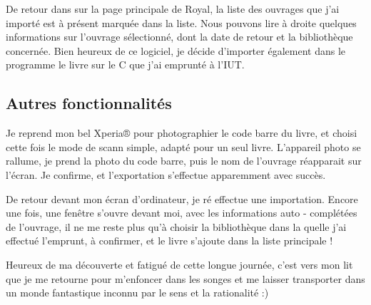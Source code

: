 De retour dans sur la page principale de Royal, la liste des ouvrages que j'ai importé est à présent marquée dans la liste. 
Nous pouvons lire à droite quelques informations sur l'ouvrage sélectionné, dont la date de retour et la bibliothèque concernée. 
Bien heureux de ce logiciel, je décide d'importer également dans le programme le livre sur le C que j'ai emprunté à l'IUT. 

\subsection {Autres fonctionnalités}

Je reprend mon bel Xperia® pour photographier le code barre du livre, et choisi cette fois le mode de scann simple, adapté pour un seul livre. 
L'appareil photo se rallume, je prend la photo du code barre, puis le nom de l'ouvrage réapparait sur l'écran.
Je confirme, et l'exportation s'effectue apparemment avec succès. 

De retour devant mon écran d'ordinateur, je ré effectue une importation. 
Encore une fois, une fenêtre s'ouvre devant moi, avec les informations auto - complétées de l'ouvrage, il ne me reste plus qu'à choisir la bibliothèque dans la quelle j'ai effectué l'emprunt, à confirmer, et le livre s'ajoute dans la liste principale !

Heureux de ma découverte et fatigué de cette longue journée, c'est vers mon lit que je me retourne pour m'enfoncer dans les songes et me laisser transporter dans un monde fantastique inconnu par le sens et la rationalité :) 

